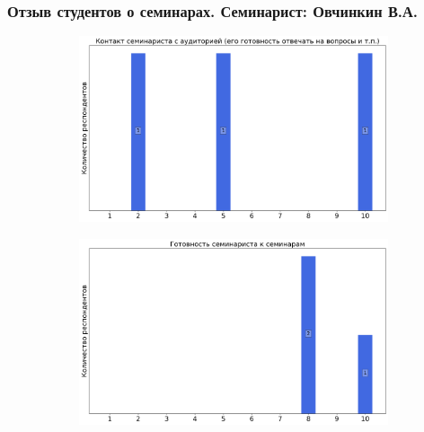 	\subsubsection{Отзыв студентов о семинарах. Семинарист: Овчинкин В.А.}
		\begin{figure}[H]
			\centering
			\begin{subfigure}[b]{0.45\textwidth}
				\centering
				\includegraphics[width=\textwidth]{images/2 course/Общая физика - электричество и магнетизм/seminarists-marks-Овчинкин В.А.-0.png}
			\end{subfigure}
			\begin{subfigure}[b]{0.45\textwidth}
				\centering
				\includegraphics[width=\textwidth]{images/2 course/Общая физика - электричество и магнетизм/seminarists-marks-Овчинкин В.А.-1.png}
			\end{subfigure}
			\begin{subfigure}[b]{0.45\textwidth}
				\centering

\end{subfigure}
\end{figure}
